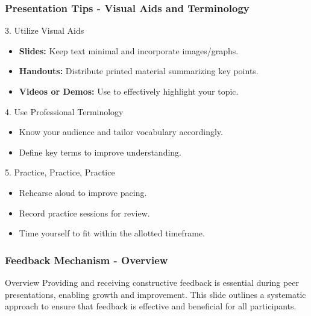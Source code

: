 \documentclass[aspectratio=169]{beamer}
\begin{document}
\begin{frame}[fragile]
    \frametitle{Presentation Tips - Visual Aids and Terminology}
    \begin{block}{3. Utilize Visual Aids}
        \begin{itemize}
            \item \textbf{Slides:} Keep text minimal and incorporate images/graphs.
            \item \textbf{Handouts:} Distribute printed material summarizing key points.
            \item \textbf{Videos or Demos:} Use to effectively highlight your topic.
        \end{itemize}
    \end{block}

    \begin{block}{4. Use Professional Terminology}
        \begin{itemize}
            \item Know your audience and tailor vocabulary accordingly.
            \item Define key terms to improve understanding.
        \end{itemize}
    \end{block}
    
    \begin{block}{5. Practice, Practice, Practice}
        \begin{itemize}
            \item Rehearse aloud to improve pacing.
            \item Record practice sessions for review.
            \item Time yourself to fit within the allotted timeframe.
        \end{itemize}
    \end{block}
\end{frame}

\begin{frame}[fragile]
    \frametitle{Feedback Mechanism - Overview}
    \begin{block}{Overview}
        Providing and receiving constructive feedback is essential during peer presentations, enabling growth and improvement.
        This slide outlines a systematic approach to ensure that feedback is effective and beneficial for all participants.
    \end{block}
\end{frame}
\end{document}

